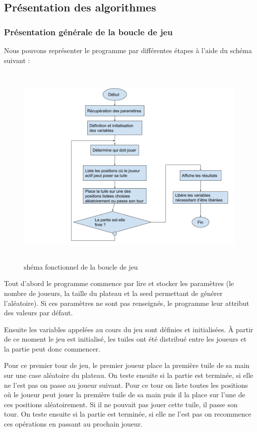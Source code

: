 \documentclass[12pt,a4paper]{extarticle}
\begin{document}
    \subsection{Pr\'esentation des algorithmes}
    \subsubsection{Pr\'esentation g\'en\'erale de la boucle de jeu}
    Nous pouvons repr\'esenter le programme par diff\'erentes \'etapes \`a l'aide du sch\'ema suivant :
    \begin{figure}[h!]
        \centering
        \includegraphics[height=10cm]{img/schemafonctionnel}
        \caption{sh\'ema fonctionnel de la boucle de jeu}
    \end{figure}
    
    Tout d'abord le programme commence par lire et stocker les param\`etres (le nombre de joueurs, la taille du plateau et la seed permettant de g\'en\'erer l'al\'eatoire). 
    Si ces param\`etres ne sont pas renseign\'es, le programme leur attribut des valeurs par d\'efaut.
    
    Ensuite les variables appel\'ees au cours du jeu sont d\'efinies et initialis\'ees. \`A partir de ce moment le jeu est initialis\'e, les tuiles ont \'et\'e 
    distribu\'e entre les joueurs et la partie peut donc commencer.
    
    Pour ce premier tour de jeu, le premier joueur place la premi\`ere tuile de sa main sur une case al\'eatoire du plateau. On teste ensuite si la partie est termin\'ee,
    si elle ne l'est pas on passe au joueur suivant. Pour ce tour on liste toutes les positions o\`u le joueur peut jouer la premi\`ere tuile de sa main puis il la place
    sur l'une de ces positions al\'eatoirement. Si il ne pouvait pas jouer cette tuile, il passe son tour. On teste ensuite si la partie est termin\'ee, si elle ne l'est pas 
    on recommence ces op\'erations en passant au prochain joueur.
    
\end{document}
